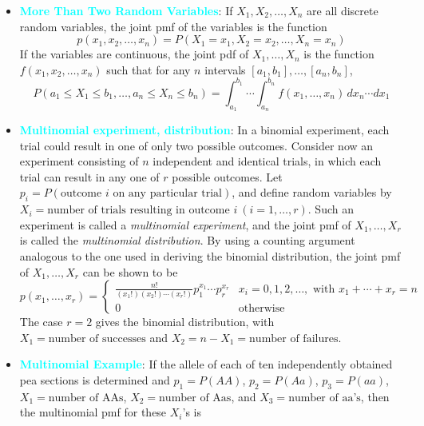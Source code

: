 \documentclass{report}
\begin{document}
\begin{itemize}
        \item \textbf{\textcolor{cyan}{More Than Two Random Variables}}:
            If \( X_1, X_2, \ldots, X_n \) are all discrete random variables, the joint pmf of the variables is the function
            \[
                p(x_1, x_2, \ldots, x_n) = P(X_1 = x_1, X_2 = x_2, \ldots, X_n = x_n)
            \]
            If the variables are continuous, the joint pdf of \( X_1, \ldots, X_n \) is the function \( f(x_1, x_2, \ldots, x_n) \) such that for any \( n \) intervals \([a_1, b_1], \ldots, [a_n, b_n]\),
            \[
                P(a_1 \leq X_1 \leq b_1, \ldots, a_n \leq X_n \leq b_n) = \int_{a_1}^{b_1} \cdots \int_{a_n}^{b_n} f(x_1, \ldots, x_n) \, dx_n \cdots dx_1
            \]
        \item \textbf{\textcolor{cyan}{Multinomial experiment, distribution}}:
            In a binomial experiment, each trial could result in one of only two possible outcomes. Consider now an experiment consisting of \( n \) independent and identical trials, in which each trial can result in any one of \( r \) possible outcomes. Let \( p_i = P(\text{outcome } i \text{ on any particular trial}) \), and define random variables by \( X_i = \text{number of trials resulting in outcome } i \ (i = 1, \ldots, r) \). Such an experiment is called a \textit{multinomial experiment}, and the joint pmf of \( X_1, \ldots, X_r \) is called the \textit{multinomial distribution}. By using a counting argument analogous to the one used in deriving the binomial distribution, the joint pmf of \( X_1, \ldots, X_r \) can be shown to be
            \[
                p(x_1, \ldots, x_r) = 
                \begin{cases} 
                    \frac{n!}{(x_1!)(x_2!) \cdots (x_r!)} p_1^{x_1} \cdots p_r^{x_r} & x_i = 0, 1, 2, \ldots, \text{ with } x_1 + \cdots + x_r = n \\
                    0 & \text{otherwise}
                \end{cases}
            \]
            The case \( r = 2 \) gives the binomial distribution, with \( X_1 = \text{number of successes} \) and \( X_2 = n - X_1 = \text{number of failures} \).
        \item \textbf{\textcolor{cyan}{Multinomial Example}}:
            If the allele of each of ten independently obtained pea sections is determined and \( p_1 = P(AA) \), \( p_2 = P(Aa) \), \( p_3 = P(aa) \), \( X_1 = \text{number of AAs} \), \( X_2 = \text{number of Aas} \), and \( X_3 = \text{number of aa's} \), then the multinomial pmf for these \( X_i \)'s is

\end{itemize}
\end{document}
